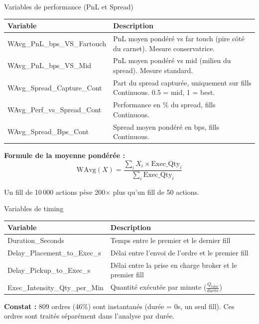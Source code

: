 \documentclass[10pt]{beamer}
\begin{document}
\begin{frame}{Variables de performance (PnL et Spread)}
\begin{tabular}{lp{6.5cm}}
\toprule
\textbf{Variable} & \textbf{Description} \\
\midrule
WAvg\_PnL\_bps\_VS\_Fartouch & PnL moyen pondéré vs far touch (pire côté du carnet). Mesure conservatrice. \\
WAvg\_PnL\_bps\_VS\_Mid & PnL moyen pondéré vs mid (milieu du spread). Mesure standard. \\
WAvg\_Spread\_Capture\_Cont & Part du spread capturée, uniquement sur fills Continuous. 0.5 = mid, 1 = best. \\
WAvg\_Perf\_vs\_Spread\_Cont & Performance en \% du spread, fills Continuous. \\
WAvg\_Spread\_Bps\_Cont & Spread moyen pondéré en bps, fills Continuous. \\
\bottomrule
\end{tabular}

\vspace{0.3cm}
\textbf{Formule de la moyenne pondérée :}
$$\text{WAvg}(X) = \frac{\sum_{i} X_i \times \text{Exec\_Qty}_i}{\sum_{i} \text{Exec\_Qty}_i}$$

Un fill de 10\,000 actions pèse 200$\times$ plus qu'un fill de 50 actions.
\end{frame}

\begin{frame}{Variables de timing}
\begin{tabular}{lp{6.5cm}}
\toprule
\textbf{Variable} & \textbf{Description} \\
\midrule
Duration\_Seconds & Temps entre le premier et le dernier fill \\
Delay\_Placement\_to\_Exec\_s & Délai entre l'envoi de l'ordre et le premier fill \\
Delay\_Pickup\_to\_Exec\_s & Délai entre la prise en charge broker et le premier fill \\
Exec\_Intensity\_Qty\_per\_Min & Quantité exécutée par minute ($\frac{Q_{total}}{durée}$) \\
\bottomrule
\end{tabular}

\vspace{0.3cm}
\textbf{Constat :} 809 ordres (46\%) sont instantanés (durée = 0s, un seul fill). Ces ordres sont traités séparément dans l'analyse par durée.
\end{frame}
\end{document}
